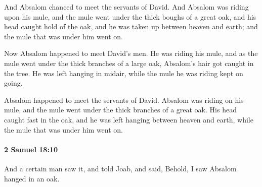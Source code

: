 			\begin{versebox}
					\item[BHS] 
					\item[ASV] And Absalom chanced to meet the servants of David. And Absalom was riding upon his mule, and the mule went under the thick boughs of a great oak, and his head caught hold of the oak, and he was taken up between heaven and earth; and the mule that was under him went on.
					\item[NIV] Now Absalom happened to meet David’s men. He was riding his mule, and as the mule went under the thick branches of a large oak, Absalom’s hair got caught in the tree. He was left hanging in midair, while the mule he was riding kept on going.
					\item[NRSV] Absalom happened to meet the servants of David. Absalom was riding on his mule, and the mule went under the thick branches of a great oak. His head caught fast in the oak, and he was left hanging between heaven and earth, while the mule that was under him went on.
			\end{versebox}

		\paragraph{2 Samuel 18:10} %
			\label{2SAMUEL-18-10}

			And a certain man saw it, and told Joab, and said, Behold, I saw Absalom hanged in an oak.

